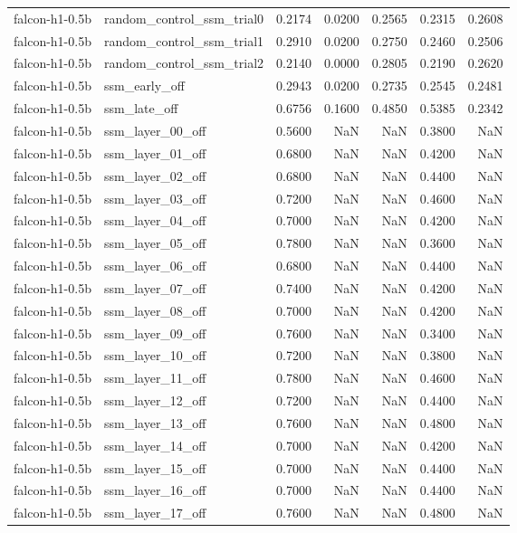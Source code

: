 \begin{tabular}{llrrrrr}
falcon-h1-0.5b & random_control_ssm_trial0 & 0.2174 & 0.0200 & 0.2565 & 0.2315 & 0.2608 \\
falcon-h1-0.5b & random_control_ssm_trial1 & 0.2910 & 0.0200 & 0.2750 & 0.2460 & 0.2506 \\
falcon-h1-0.5b & random_control_ssm_trial2 & 0.2140 & 0.0000 & 0.2805 & 0.2190 & 0.2620 \\
falcon-h1-0.5b & ssm_early_off & 0.2943 & 0.0200 & 0.2735 & 0.2545 & 0.2481 \\
falcon-h1-0.5b & ssm_late_off & 0.6756 & 0.1600 & 0.4850 & 0.5385 & 0.2342 \\
falcon-h1-0.5b & ssm_layer_00_off & 0.5600 & NaN & NaN & 0.3800 & NaN \\
falcon-h1-0.5b & ssm_layer_01_off & 0.6800 & NaN & NaN & 0.4200 & NaN \\
falcon-h1-0.5b & ssm_layer_02_off & 0.6800 & NaN & NaN & 0.4400 & NaN \\
falcon-h1-0.5b & ssm_layer_03_off & 0.7200 & NaN & NaN & 0.4600 & NaN \\
falcon-h1-0.5b & ssm_layer_04_off & 0.7000 & NaN & NaN & 0.4200 & NaN \\
falcon-h1-0.5b & ssm_layer_05_off & 0.7800 & NaN & NaN & 0.3600 & NaN \\
falcon-h1-0.5b & ssm_layer_06_off & 0.6800 & NaN & NaN & 0.4400 & NaN \\
falcon-h1-0.5b & ssm_layer_07_off & 0.7400 & NaN & NaN & 0.4200 & NaN \\
falcon-h1-0.5b & ssm_layer_08_off & 0.7000 & NaN & NaN & 0.4200 & NaN \\
falcon-h1-0.5b & ssm_layer_09_off & 0.7600 & NaN & NaN & 0.3400 & NaN \\
falcon-h1-0.5b & ssm_layer_10_off & 0.7200 & NaN & NaN & 0.3800 & NaN \\
falcon-h1-0.5b & ssm_layer_11_off & 0.7800 & NaN & NaN & 0.4600 & NaN \\
falcon-h1-0.5b & ssm_layer_12_off & 0.7200 & NaN & NaN & 0.4400 & NaN \\
falcon-h1-0.5b & ssm_layer_13_off & 0.7600 & NaN & NaN & 0.4800 & NaN \\
falcon-h1-0.5b & ssm_layer_14_off & 0.7000 & NaN & NaN & 0.4200 & NaN \\
falcon-h1-0.5b & ssm_layer_15_off & 0.7000 & NaN & NaN & 0.4400 & NaN \\
falcon-h1-0.5b & ssm_layer_16_off & 0.7000 & NaN & NaN & 0.4400 & NaN \\
falcon-h1-0.5b & ssm_layer_17_off & 0.7600 & NaN & NaN & 0.4800 & NaN \\

\end{tabular}
